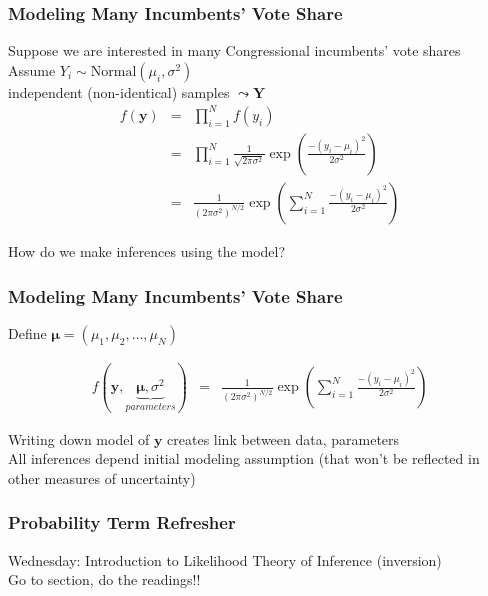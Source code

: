 \documentclass{beamer}
\begin{document}
\begin{frame}
\frametitle{Modeling Many Incumbents' Vote Share}


Suppose we are interested in many Congressional incumbents' vote shares\\
Assume $Y_{i} \sim \text{Normal}(\mu_{i}, \sigma^2)$\\
independent (non-identical) samples $\leadsto \boldsymbol{Y} $\\

\begin{eqnarray}
f(\boldsymbol{y} ) & = & \prod_{i=1}^{N} f(y_{i} ) \nonumber\\
					& = & \prod_{i=1}^{N}\frac{1}{\sqrt{2 \pi \sigma^2}  } \exp\left( \frac{ - (y_{i} - \mu_{i} )^ 2 }{2\sigma^2}\right)\nonumber \\
					& = & \frac{1}{ \left( 2 \pi \sigma^2  \right)^{N/2}} \exp \left(\sum_{i=1}^{N} \frac{- (y_i - \mu_{i} )^2}{2\sigma^2}   \right) \nonumber
\end{eqnarray}


How do we make inferences using the model?

\end{frame}

\begin{frame}
\frametitle{Modeling Many Incumbents' Vote Share}

Define $\boldsymbol{\mu} = (\mu_{1}, \mu_{2}, \hdots, \mu_{N})$


\begin{eqnarray}
f(\boldsymbol{y}, \underbrace{\boldsymbol{\mu}, \sigma^2}_{parameters}) & = & \frac{1}{ \left( 2 \pi \sigma^2  \right)^{N/2}} \exp \left(\sum_{i=1}^{N} \frac{- (y_i - \mu_{i} )^2}{2\sigma^2}   \right) \nonumber
\end{eqnarray}

Writing down model of $\boldsymbol{y}$ creates link between data, parameters\\
All inferences depend \alert{initial modeling assumption} (that won't be reflected in other measures of uncertainty)

\end{frame}


\begin{frame}
\frametitle{Probability Term Refresher}

\pause
\begin{itemize}
 \pause
{} \pause
{} \pause
{} \pause
{}
\end{itemize}



\end{frame}


\begin{frame}
Wednesday: Introduction to Likelihood Theory of Inference (inversion)\\
Go to section, do the readings!!



\end{frame}
\end{document}
